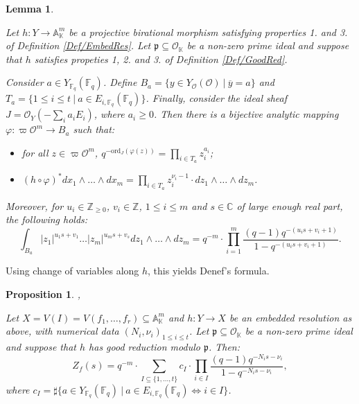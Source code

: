 \documentclass[11pt,english]{article}
\numberwithin{equation}{section}
\numberwithin{figure}{section}
\theoremstyle{definition}
\theoremstyle{plain}
\newtheorem{prop}[df]{Proposition}
\newtheorem{lem}[df]{Lemma}
\theoremstyle{remark}
\newcommand\ZZ{\mathbb{Z}}
\newcommand\FF{\mathbb{F}}
\newcommand\KK{\mathbb{K}}
\newcommand\CC{\mathbb{C}}
\begin{document}
\begin{lem}{\cite[Proof of Thm. 3.1, Eqn. (4)]{Den87}} \label{Lem/DenefLemma}

Let $h:Y\rightarrow\mathbb{A}_{\KK}^{m}$ be a projective birational
morphism satisfying properties 1. and 3. of Definition \ref{Def/EmbedRes}.
Let $\mathfrak{p}\subseteq\mathcal{O}_{\KK}$ be a non-zero prime
ideal and suppose that $h$ satisfies propeties 1, 2. and 3. of Definition
\ref{Def/GoodRed}.

Consider $a\in Y_{\FF_{q}}(\FF_{q})$. Define $B_{a}=\{y\in Y_{\mathcal{O}}(\mathcal{O})\ \vert\ \overline{y}=a\}$
and $T_{a}=\{1\leq i\leq t\ \vert\ a\in E_{i,\FF_{q}}(\FF_{q})\}$.
Finally, consider the ideal sheaf $J=\mathcal{O}_{Y}(-\sum_{i}a_{i}E_{i})$,
where $a_{i}\geq0$. Then there is a bijective analytic mapping $\varphi:\varpi\mathcal{O}^{m}\rightarrow B_{a}$
such that:
\begin{itemize}
\item for all $z\in\varpi\mathcal{O}^{m}$, $q^{-\mathrm{ord}_{J}(\varphi(z))}=\prod_{i\in T_{a}}z_{i}^{a_{i}}$;
\item $(h\circ\varphi)^{*}dx_{1}\wedge\ldots\wedge dx_{m}=\prod_{i\in T_{a}}z_{i}^{\nu_{i}-1}\cdot dz_{1}\wedge\ldots\wedge dz_{m}$.
\end{itemize}
Moreover, for $u_{i}\in\ZZ_{\geq0}$, $v_{i}\in\ZZ$, $1\leq i\leq m$
and $s\in\CC$ of large enough real part, the following holds:\[
\int_{B_a}\vert z_1\vert^{u_1s+v_1}\ldots\vert z_m\vert^{u_ms+v_s}dz_1\wedge\ldots\wedge dz_m=q^{-m}\cdot\prod_{i=1}^m\frac{(q-1)q^{-(u_is+v_i+1)}}{1-q^{-(u_is+v_i+1)}}.
\]

\end{lem}

Using change of variables along $h$, this yields Denef's formula.

\begin{prop}{\cite[Thm. 3.1.]{Den87},\cite[Thm. 2.10.]{VZG08}}

Let $X=V(I)=V(f_{1},\ldots,f_{r})\subseteq\mathbb{A}_{\KK}^{m}$ and
$h:Y\rightarrow X$ be an embedded resolution as above, with numerical
data $(N_{i},\nu_{i})_{1\leq i\leq t}$. Let $\mathfrak{p}\subseteq\mathcal{O}_{\KK}$
be a non-zero prime ideal and suppose that $h$ has good reduction
modulo $\mathfrak{p}$. Then:\[
Z_f(s)=q^{-m}\cdot\sum_{I\subseteq\{ 1,\ldots,t\}}c_I\cdot\prod_{i\in I}\frac{(q-1)q^{-N_is-\nu_i}}{1-q^{-N_is-\nu_i}},
\]where $c_{I}=\sharp\{a\in Y_{\FF_{q}}(\FF_{q})\ \vert\ a\in E_{i,\FF_{q}}(\FF_{q})\Leftrightarrow i\in I\}$.

\end{prop}
\end{document}
